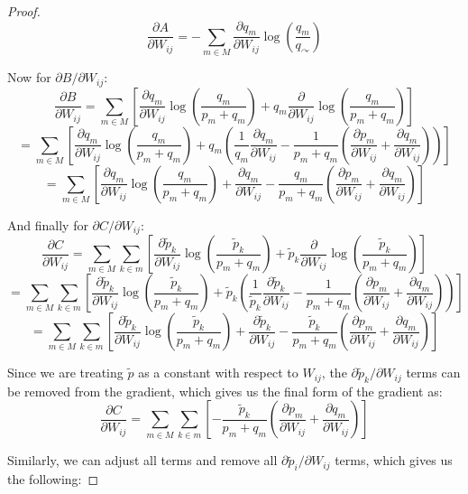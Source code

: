 \documentclass[pdflatex,sn-mathphys-num]{sn-jnl}%
\theoremstyle{thmstyleone}%
\theoremstyle{thmstyletwo}%
\theoremstyle{thmstylethree}%
\begin{document}
\begin{appendices}
\begin{proof}
$$\frac{\partial A}{\partial W_{ij}} = -\sum_{m \in M} \frac{\partial q_m}{\partial W_{ij}} \log \left( \frac{q_m}{q_{\curvearrowright}} \right)$$

Now for $\partial B / \partial W_{ij}$:
$$\frac{\partial B}{\partial W_{ij}} = \sum_{m \in M} \left[ \frac{\partial q_m}{\partial W_{ij}} \log \left( \frac{q_m}{p_m + q_m} \right) + q_m \frac{\partial}{\partial W_{ij}} \log \left( \frac{q_m}{p_m + q_m} \right) \right]$$
$$ = \sum_{m \in M} \left[ \frac{\partial q_m}{\partial W_{ij}} \log \left( \frac{q_m}{p_m + q_m} \right) + q_m \left( \frac{1}{q_m} \frac{\partial q_m}{\partial W_{ij}} - \frac{1}{p_m + q_m} \left( \frac{\partial p_m}{\partial W_{ij}} + \frac{\partial q_m}{\partial W_{ij}} \right) \right) \right]$$
$$ = \sum_{m \in M} \left[ \frac{\partial q_m}{\partial W_{ij}} \log \left( \frac{q_m}{p_m + q_m} \right) + \frac{\partial q_m}{\partial W_{ij}} - \frac{q_m}{p_m + q_m} \left( \frac{\partial p_m}{\partial W_{ij}} + \frac{\partial q_m}{\partial W_{ij}} \right) \right]$$

And finally for $\partial C / \partial W_{ij}$:
$$\frac{\partial C}{\partial W_{ij}} = \sum_{m \in M} \sum_{k \in m} \left[ \frac{\partial \tilde{p}_k}{\partial W_{ij}} \log \left( \frac{\tilde{p}_k}{p_m + q_m} \right) + \tilde{p}_k \frac{\partial}{\partial W_{ij}} \log \left(\frac{\tilde{p}_k}{p_m + q_m} \right) \right]$$
$$ = \sum_{m \in M} \sum_{k \in m} \left[ \frac{\partial \tilde{p}_k}{\partial W_{ij}} \log \left( \frac{\tilde{p}_k}{p_m + q_m} \right) + \tilde{p}_k \left( \frac{1}{\tilde{p}_k} \frac{\partial \tilde{p}_k}{\partial W_{ij}} - \frac{1}{p_m + q_m} \left( \frac{\partial p_m}{\partial W_{ij}} + \frac{\partial q_m}{\partial W_{ij}} \right) \right) \right]$$
$$ = \sum_{m \in M} \sum_{k \in m} \left[ \frac{\partial \tilde{p}_k}{\partial W_{ij}} \log \left( \frac{\tilde{p}_k}{p_m + q_m} \right) + \frac{\partial \tilde{p}_k}{\partial W_{ij}} - \frac{\tilde{p}_k}{p_m + q_m} \left( \frac{\partial p_m}{\partial W_{ij}} + \frac{\partial q_m}{\partial W_{ij}} \right) \right]$$

Since we are treating $\tilde{p}$ as a constant with respect to $W_{ij}$, the $\partial \tilde{p}_k / \partial W_{ij}$ terms can be removed from the gradient, which gives us the final form of the gradient as:
$$\frac{\partial C}{\partial W_{ij}} = \sum_{m \in M} \sum_{k \in m} \left[ - \frac{\tilde{p}_k}{p_m + q_m} \left( \frac{\partial p_m}{\partial W_{ij}} + \frac{\partial q_m}{\partial W_{ij}} \right) \right]$$

Similarly, we can adjust all terms and remove all $\partial \tilde{p}_i / \partial W_{ij}$ terms, which gives us the following:


\end{proof}
\end{appendices}
\end{document}
